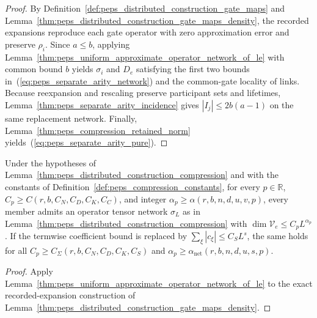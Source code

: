 \begin{proof}\leanok
    By Definition~\ref{def:peps_distributed_construction_gate_maps} and
    Lemma~\ref{thm:peps_distributed_construction_gate_maps_density}, the
    recorded expansions reproduce each gate operator with zero approximation
    error and preserve $\rho_i$. Since $a\le b$, applying
    Lemma~\ref{thm:peps_uniform_approximate_operator_network_of_le} with
    common bound $b$ yields $\sigma_i$ and $D_e$ satisfying the first two bounds
    in~(\ref{eq:peps_separate_arity_network}) and the common-gate locality of
    links. Because reexpansion and rescaling preserve participant sets and
    lifetimes, Lemma~\ref{thm:peps_separate_arity_incidence} gives
    $|I_j|\le 2b(a-1)$ on the same replacement network. Finally,
    Lemma~\ref{thm:peps_compression_retained_norm} yields~(\ref{eq:peps_separate_arity_pure}).
\end{proof}

\begin{lemma}
    \label{thm:peps_distributed_construction_compression_of_le}
    \leanok
    Under the hypotheses of
    Lemma~\ref{thm:peps_distributed_construction_compression} and with the
    constants of Definition~\ref{def:peps_compression_constants}, for every
    $p\in\mathbb R$, $C_p\ge C(r,b,C_N,C_D,C_K,C_C)$, and integer
    $\alpha_p\ge\alpha(r,b,n,d,u,v,p)$, every member admits an operator tensor
    network $\sigma_L$ as in
    Lemma~\ref{thm:peps_distributed_construction_compression} with
    $\dim\mathcal V_e\le C_pL^{\alpha_p}$. If the termwise coefficient bound is
    replaced by $\sum_\xi|c_\xi|\le C_SL^s$, the same holds for all
    $C_p\ge C_\Sigma(r,b,C_N,C_D,C_K,C_S)$ and
    $\alpha_p\ge\alpha_{\mathrm{net}}(r,b,n,d,u,s,p)$.
\end{lemma}
\begin{proof}
    \leanok
    Apply Lemma~\ref{thm:peps_uniform_approximate_operator_network_of_le} to
    the exact recorded-expansion construction of
    Lemma~\ref{thm:peps_distributed_construction_gate_maps_density}.
\end{proof}

